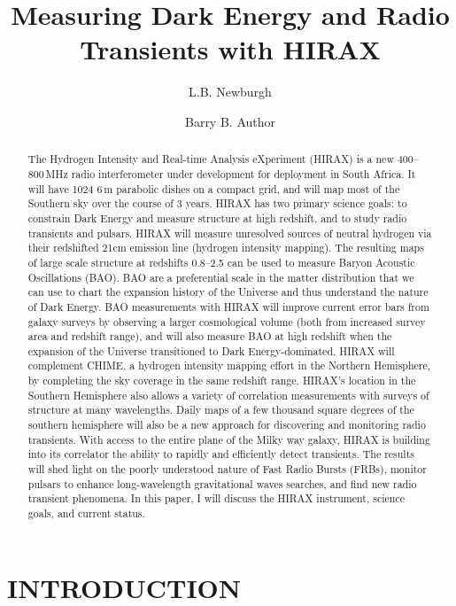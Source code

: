 \documentclass[]{spie}  %
\title{Measuring Dark Energy and Radio Transients with HIRAX}
\author[a]{L.B. Newburgh}
\author[b]{Barry B. Author}
\affil[a]{Dunlap Institute, University of Toronto, 50 St. George St., Toronto, Canada}
\affil[b]{Affiliation2, Address, City, Country}
\begin{document}
 
\maketitle

\begin{abstract}
The Hydrogen Intensity and Real-time Analysis eXperiment (HIRAX) is a new 400--800\,MHz radio interferometer under development for deployment in South Africa. It will have 1024 6\,m parabolic dishes on a compact grid, and will map most of the Southern sky over the course of 3 years. HIRAX has two primary science goals: to constrain Dark Energy and measure structure at high redshift, and to study radio transients and pulsars. HIRAX will measure unresolved sources of neutral hydrogen via their redshifted 21cm emission line (hydrogen intensity mapping). The resulting maps of large scale structure at redshifts 0.8--2.5 can be used to measure Baryon Acoustic Oscillations (BAO). BAO are a preferential scale in the matter distribution that we can use to chart the expansion history of the Universe and thus understand the nature of Dark Energy. BAO measurements with HIRAX will improve current error bars from galaxy surveys by observing a larger cosmological volume (both from increased survey area and redshift range), and will also measure BAO at high redshift when the expansion of the Universe transitioned to Dark Energy-dominated. HIRAX will complement CHIME, a hydrogen intensity mapping effort in the Northern Hemisphere, by completing the sky coverage in the same redshift range. HIRAX's location in the Southern Hemisphere also allows a variety of correlation measurements with surveys of structure at many wavelengths. Daily maps of a few thousand square degrees of the southern hemisphere will also be a new approach for discovering and monitoring radio transients. With access to the entire plane of the Milky way galaxy, HIRAX is building into its correlator the ability to rapidly and efficiently detect transients. The results will shed light on the poorly understood nature of Fast Radio Bursts (FRBs), monitor pulsars to enhance long-wavelength gravitational waves searches, and find new radio transient phenomena. In this paper, I will discuss the HIRAX instrument, science goals, and current status.
\end{abstract}


\section{INTRODUCTION}
\label{sec:intro}  %
\end{document}
